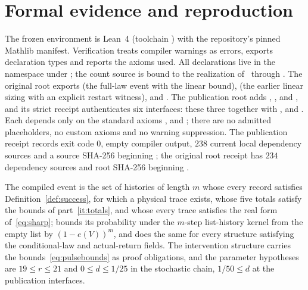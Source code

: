 \documentclass[11pt,a4paper]{article}
\theoremstyle{plain}
\theoremstyle{definition}
\theoremstyle{remark}
\begin{document}
\section{Formal evidence and reproduction}\label{app:formal}
The frozen environment is Lean~4 (toolchain ) with the repository's pinned Mathlib manifest. Verification treats compiler warnings as errors, exports declaration types and reports the axioms used. All declarations live in the namespace  under ; the count source is bound to the realization of~\citep{thermo2026} through . The original root  exports  (the full-law event with the linear bound),  (the earlier linear sizing with an explicit restart witness),  and . The publication root  adds , ,  and , and its strict receipt authenticates six interfaces: these three together with ,  and . Each depends only on the standard axioms ,  and ; there are no admitted placeholders, no custom axioms and no warning suppression. The publication receipt records exit code $0$, empty compiler output, $238$ current local dependency sources and a source SHA-256 beginning ; the original root receipt has $234$ dependency sources and root SHA-256 beginning .

The compiled event  is the set of histories of length $m$ whose every record satisfies Definition~\ref{def:success}, for which a physical trace exists, whose five totals satisfy the bounds of part~\ref{it:totals}, and whose every trace satisfies the real form of~\eqref{eq:sharp};  bounds its probability under the $m$-step list-history kernel from the empty list by $(1-e(V))^m$, and  does the same for every structure  satisfying the conditional-law and actual-return fields. The intervention structure carries the bounds~\eqref{eq:pulsebounds} as proof obligations, and the parameter hypotheses are $19\le r\le21$ and $0\le d\le1/25$ in the stochastic chain, $1/50\le d$ at the publication interfaces.
\end{document}
